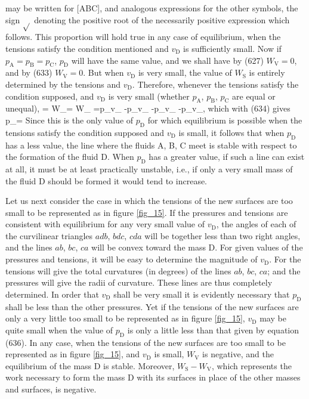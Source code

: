 \documentclass[12pt]{article}
\begin{document}
may be written for [ABC], and analogous expressions for the other symbols, the sign $\sqrt{}$ denoting the positive root of the necessarily positive expression which follows. This proportion will hold true in any case of equilibrium, when the tensions satisfy the condition mentioned and $v_\text{D}$ is sufficiently small. Now if $p_\text{A}=p_\text{B}=p_\text{C}$, $p_\text{D}$ will have the same value, and we shall have by (627) $W_\text{V}=0$, and by (633) $W_\text{V} =0$. But when $v_\text{D}$ is very small, the value of $W_\text{S}$ is entirely determined by the tensions and $v_\text{D}$. Therefore, whenever the tensions satisfy the condition supposed, and $v_\text{D}$ is very small (whether $p_\text{A}$, $p_\text{B}$, $p_\text{C}$ are equal or unequal),
 = W_= W_ =p_v_ -p_v_ -p_v_ -p_v_,          \label{634} \eqe
which with (634) gives
\eqs p_=\label{635} \eqe
Since this is the only value of $p_\text{D}$ for which equilibrium is possible when the tensions satisfy the condition supposed and $v_\text{D}$ is small, it follows that when $p_\text{D}$ has a less value, the line where the fluids A, B, C meet is stable with respect to the formation of the fluid D. When $p_\text{D}$ has a greater value, if such a line can exist at all, it must be at least practically unstable, i.e., if only a very small mass of the fluid D should be formed it would tend to increase.

Let us next consider the case in which the tensions of the new surfaces are too small to be represented as in figure \ref{fig_15}. If the pressures and tensions are consistent with equilibrium for any very small value of $v_\text{D}$, the angles of each of the curvilinear triangles $adb$, $bdc$, $cda$ will be together less than two right angles, and the lines $ab$, $bc$, $ca$ will be convex toward the mass D. For given values of the pressures and tensions, it will be easy to determine the magnitude of $v_\text{D}$. For the tensions will give the total curvatures (in degrees) of the lines $ab$, $bc$, $ca$; and the pressures will give the radii of curvature. These lines are thus completely determined. In order that $v_\text{D}$ shall be very small it is evidently necessary that $p_\text{D}$ shall be less than the other pressures. Yet if the tensions of the new surfaces are only a very little too small to be represented as in figure \ref{fig_15}, $v_\text{D}$ may be quite small when the value of $p_\text{D}$ is only a little less than that given by equation (636). In any case, when the tensions of the new surfaces are too small to be represented as in figure \ref{fig_15}, and $v_\text{D}$ is small, $W_\text{V}$ is negative, and the equilibrium of the mass D is stable. Moreover, $W_\text{S}-W_\text{V}$, which represents the work necessary to form the mass D with its surfaces in place of the other masses and surfaces, is negative.
\end{document}
